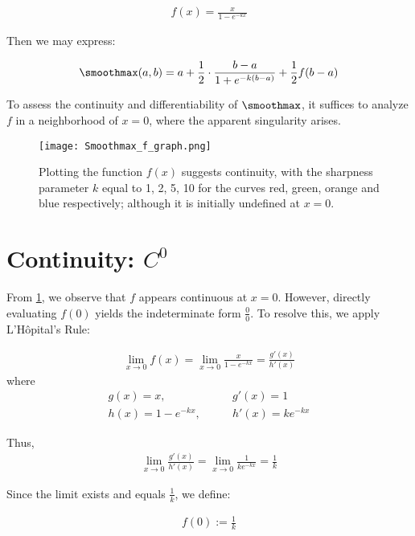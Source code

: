 \begin{align}
    f(x) = \frac{x}{1 - e^{-kx}}
\end{align}

Then we may express:

\begin{align}
    \smoothmax(a, b) = a + \frac{1}{2} \cdot \frac{b - a}{1 + e^{-k(b - a)}} + \frac{1}{2} f(b - a)
\end{align}

To assess the continuity and differentiability of $\smoothmax$, it suffices to analyze $f$ in a neighborhood of $x = 0$, where the apparent singularity arises.

\begin{figure}
    \texttt{[image: Smoothmax\_f\_graph.png]}
    \caption{Plotting the function $f(x)$ suggests continuity, with the sharpness parameter $k$ equal to 1, 2, 5, 10 for the curves red, green, orange and blue respectively; although it is initially undefined at $x = 0$.}
    \label{fig:smoothmax-f-plot}
\end{figure}

\section{Continuity: $C^0$}

From \cref{fig:smoothmax-f-plot}, we observe that $f$ appears continuous at $x = 0$. However, directly evaluating $f(0)$ yields the indeterminate form $\frac{0}{0}$. To resolve this, we apply L’Hôpital’s Rule:

\begin{align}
    \lim_{x \to 0} f(x) = \lim_{x \to 0} \frac{x}{1 - e^{-kx}} = \frac{g'(x)}{h'(x)}
\end{align}
where
\begin{align}
    g(x) = x, \quad & \quad g'(x) = 1 \\
    h(x) = 1 - e^{-kx}, \quad & \quad h'(x) = k e^{-kx}
\end{align}

Thus,
\begin{align}
    \lim_{x \to 0} \frac{g'(x)}{h'(x)} = \lim_{x \to 0} \frac{1}{k e^{-kx}} = \frac{1}{k}
\end{align}

Since the limit exists and equals $\frac{1}{k}$, we define:

\begin{align}
    f(0) := \frac{1}{k}
\end{align}

